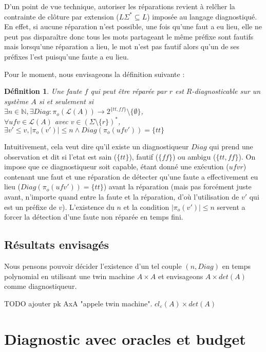 \documentclass[a4paper,10pt]{article}
\newtheorem{mydef}{D\'efinition}
\begin{document}
D'un point de vue technique, autoriser les r\'eparations revient \`a rel\^cher la contrainte de cl\^oture par extension ($L\Sigma^*\subseteq L$) impos\'ee au langage diagnostiqu\'e. En effet, si aucune r\'eparation n'est possible, une fois qu'une faut a eu lieu, elle ne peut pas dispara\^itre donc tous les mots partageant le m\^eme pr\'efixe sont fautifs mais lorsqu'une r\'eparation a lieu, le mot n'est pas fautif alors qu'un de ses pr\'efixes l'est puisqu'une faute a eu lieu.

Pour le moment, nous envisageons la d\'efinition suivante :

\begin{mydef}
  Une faute $f$ qui peut \^etre r\'epar\'ee par $r$ est $R$-diagnosticable sur un syst\`eme $A$ si et seulement si\\
  $\exists n \in \mathbb N,\exists Diag : \pi_o(\mathcal L(A)) \to 2^{\{tt, ff\}}\setminus \{\emptyset\}$,\\
  $\forall ufv\in \mathcal L(A)$ avec $v\in \left(\Sigma\setminus \{r\}\right)^*$,\\
  $\exists v'\le v, |\pi_o(v')| \le n \land Diag(\pi_o(ufv'))=\{tt\}$
\end{mydef}

Intuitivement, cela veut dire qu'il existe un diagnostiqueur $Diag$ qui prend une observation et dit si l'etat est sain ($\{tt\}$), fautif ($\{ff\}$) ou ambigu ($\{tt, ff\}$). On impose que ce diagnostiqueur soit capable, \'etant donn\'e une ex\'ecution ($ufvr$) contenant une faut et une r\'eparation de d\'etecter qu'une faute a effectivement eu lieu ($Diag(\pi_o(ufv'))=\{tt\}$) avant la r\'eparation (mais pas forc\'ement juste avant, n'importe quand entre la faute et la r\'eparation, d'o\`u l'utilisation de $v'$ qui est un pr\'efixe de $v$). L'existence du $n$ et la condition $|\pi_o(v')| \le n$ servent a forcer la d\'etection d'une faute non r\'epar\'ee en temps fini.

\subsection{R\'esultats envisag\'es}

Nous pensons pouvoir d\'ecider l'existence d'un tel couple $(n, Diag)$ en temps polynomial en utilisant une twin machine $A\times A$ et envisageons $A\times det(A)$ comme diagnostiqueur.

TODO ajouter pk AxA "appele twin machine". $cl_\varepsilon(A)\times det(A)$

\section{Diagnostic avec oracles et budget}
\end{document}

